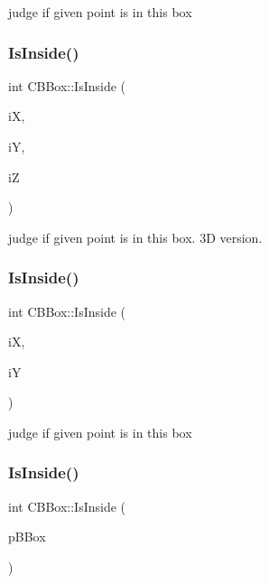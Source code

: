 judge if given point is in this box \mbox{\label{classCBBox_ab8c8772201f6864c1fdf7a4bb78bdd50}} 
\subsubsection{\texorpdfstring{IsInside()}{IsInside()}\hspace{0.1cm}{\footnotesize\ttfamily [2/4]}}
{\footnotesize\ttfamily int C\+B\+Box\+::\+Is\+Inside (\begin{DoxyParamCaption}\item[{int}]{iX,  }\item[{int}]{iY,  }\item[{int}]{iZ }\end{DoxyParamCaption})}

judge if given point is in this box. 3D version. \mbox{\label{classCBBox_a06176ef2a9c66bd680fe01ec001a7830}} 
\subsubsection{\texorpdfstring{IsInside()}{IsInside()}\hspace{0.1cm}{\footnotesize\ttfamily [3/4]}}
{\footnotesize\ttfamily int C\+B\+Box\+::\+Is\+Inside (\begin{DoxyParamCaption}\item[{int}]{iX,  }\item[{int}]{iY }\end{DoxyParamCaption})}

judge if given point is in this box \mbox{\label{classCBBox_ad00a75c0330ee8138ea4a46b45eb1acb}} 
\subsubsection{\texorpdfstring{IsInside()}{IsInside()}\hspace{0.1cm}{\footnotesize\ttfamily [4/4]}}
{\footnotesize\ttfamily int C\+B\+Box\+::\+Is\+Inside (\begin{DoxyParamCaption}\item[{\mbox{\hyperlink{classCBBox}{C\+B\+Box}} $\ast$}]{p\+B\+Box }\end{DoxyParamCaption})}

